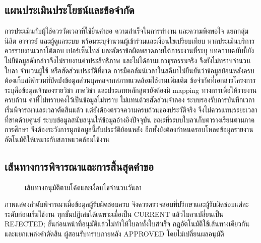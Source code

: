 \subsection{แผนประเมินประโยชน์และข้อจำกัด}
การประเมินกับผู้ใช้ควรวัดเวลาที่ใช้ยื่นคำขอ ความสำเร็จในการทำงาน
และความพึงพอใจ แยกกลุ่มนิสิต อาจารย์ และผู้ดูแลระบบ
พร้อมระบุจำนวนผู้เข้าร่วมและเงื่อนไขเปรียบเทียบ
หากประเมินบริการควรรายงานเวลาโต้ตอบ เปอร์เซ็นไทล์
และอัตราข้อผิดพลาดภายใต้ภาระงานที่ระบุ
บทความฉบับนี้ยังไม่มีข้อมูลดังกล่าวจึงไม่รายงานค่าประสิทธิภาพ
และไม่ได้อ่านแถวธุรกรรมจริง จึงยังไม่ทราบจำนวนใบลา จำนวนผู้ใช้
หรือสัดส่วนประวัติที่ขาด
การมีคอลัมน์เวลาในสคีมาไม่ยืนยันว่าข้อมูลย้อนหลังครบ
ต้องเก็บสถิติรวมที่ปิดบังข้อมูลส่วนบุคคลจากสภาพแวดล้อมใช้งานเพิ่มเติม
ข้อจำกัดที่เอกสารโครงการระบุคือข้อมูลเจ้าของรายวิชา ภาควิชา
และประเภทหลักสูตรยังต้องมี mapping ทางการเพื่อให้รายงานครบถ้วน
ค่าที่ไม่ทราบคงไว้เป็นข้อมูลไม่ทราบ ไม่แทนด้วยสัดส่วนจำลอง
ระบบรองรับการบันทึกเวลาเริ่มพิจารณาและเวลาตัดสินแล้ว
แต่ยังต้องตรวจความครบถ้วนของประวัติจริง
จึงไม่ควรแทนระยะเวลาที่ขาดด้วยศูนย์
ระบบข้อมูลสนับสนุนให้ข้อมูลอ้างอิงปัจจุบัน
ขณะที่ระบบใบลาเก็บตารางเรียนตามภาคการศึกษา
จึงต้องระวังการผูกข้อมูลนี้กับประวัติย้อนหลัง
อีกทั้งยังต้องกำหนดรอบโหลดข้อมูลรายงานอัตโนมัติให้เหมาะกับสภาพแวดล้อมใช้งาน

\subsection{เส้นทางการพิจารณาและการสิ้นสุดคำขอ}
\begin{figure}[H]\centering
  \caption{เส้นทางอนุมัติตามโค้ดและเงื่อนไขจำนวนวันลา}\label{fig:approval-route}
\end{figure}
ภาพแสดงลำดับพิจารณาเมื่อข้อมูลผู้รับผิดชอบครบ
จึงควรตรวจสอบที่ปรึกษาและผู้รับผิดชอบแต่ละระดับก่อนเริ่มใช้งาน
ทุกขั้นปฏิเสธได้เฉพาะเมื่อเป็น CURRENT แล้วใบลาเปลี่ยนเป็น REJECTED;
ขั้นก่อนหน้าที่อนุมัติแล้วไม่ทำให้ใบลาทั้งใบสำเร็จ
กฎอัตโนมัติใช้เส้นทางเดียวกันและแยกแหล่งคำตัดสิน ผู้สอนรับทราบภายหลัง
APPROVED โดยไม่เปลี่ยนผลอนุมัติ



